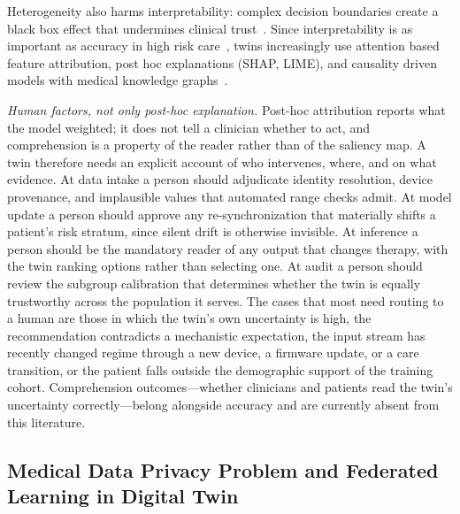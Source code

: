 \documentclass[journal]{IEEEtran}
\begin{document}
Heterogeneity also harms interpretability: complex decision boundaries create a black box effect that undermines clinical trust~\cite{rudin2019stopexplaining}. Since interpretability is as important as accuracy in high risk care~\cite{tonekaboni2019clinicians,lundberg2017unified,voigt2021digital}, twins increasingly use attention based feature attribution, post hoc explanations (SHAP, LIME), and causality driven models with medical knowledge graphs~\cite{ahmad2018interpretable}.

\emph{Human factors, not only post-hoc explanation.} Post-hoc attribution reports what the model weighted; it does not tell a clinician whether to act, and comprehension is a property of the reader rather than of the saliency map. A twin therefore needs an explicit account of who intervenes, where, and on what evidence. At data intake a person should adjudicate identity resolution, device provenance, and implausible values that automated range checks admit. At model update a person should approve any re-synchronization that materially shifts a patient's risk stratum, since silent drift is otherwise invisible. At inference a person should be the mandatory reader of any output that changes therapy, with the twin ranking options rather than selecting one. At audit a person should review the subgroup calibration that determines whether the twin is equally trustworthy across the population it serves. The cases that most need routing to a human are those in which the twin's own uncertainty is high, the recommendation contradicts a mechanistic expectation, the input stream has recently changed regime through a new device, a firmware update, or a care transition, or the patient falls outside the demographic support of the training cohort. Comprehension outcomes---whether clinicians and patients read the twin's uncertainty correctly---belong alongside accuracy and are currently absent from this literature.

\subsection{Medical Data Privacy Problem and Federated Learning in Digital Twin}
\end{document}
